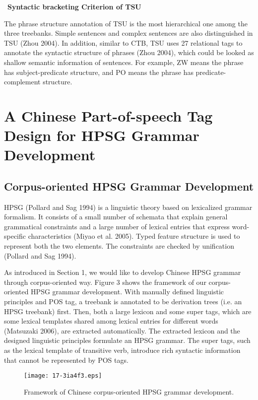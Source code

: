 \documentclass[english]{jnlp_1.4}
\begin{document}
\noindent
\textbullet\ \textbf{Syntactic bracketing Criterion of TSU}

The phrase structure annotation of TSU is the most hierarchical one among 
the three treebanks. Simple sentences and complex sentences are also 
distinguished in TSU (Zhou 2004). In addition, similar to CTB, TSU uses 27 
relational tags to annotate the syntactic structure of phrases (Zhou 2004), 
which could be looked as shallow semantic information of sentences. For 
example, ZW means the phrase has subject-predicate structure, and PO means 
the phrase has predicate-complement structure.


\section{A Chinese Part-of-speech Tag Design for HPSG Grammar Development}

\subsection{Corpus-oriented HPSG Grammar Development}

HPSG (Pollard and Sag 1994) is a linguistic theory based on lexicalized 
grammar formalism. It consists of a small number of schemata that explain 
general grammatical constraints and a large number of lexical entries that 
express word-specific characteristics (Miyao et al. 2005). Typed feature 
structure is used to represent both the two elements. The constraints are 
checked by unification (Pollard and Sag 1994). 

As introduced in Section 1, we would like to develop Chinese HPSG grammar 
through corpus-oriented way. Figure 3 shows the framework of our 
corpus-oriented HPSG grammar development. With manually defined linguistic 
principles and POS tag, a treebank is annotated to be derivation trees (i.e. 
an HPSG treebank) first. Then, both a large lexicon and some super tags, 
which are some lexical templates shared among lexical entries for different 
words (Matsuzaki 2006), are extracted automatically. The extracted lexicon 
and the designed linguistic principles formulate an HPSG grammar. The super 
tags, such as the lexical template of transitive verb, introduce rich 
syntactic information that cannot be represented by POS tags. 

\begin{figure}[b]
\begin{center}
\texttt{[image: 17-3ia4f3.eps]}
\end{center}
\caption{Framework of Chinese corpus-oriented HPSG grammar development.} 
\end{figure}
\end{document}
